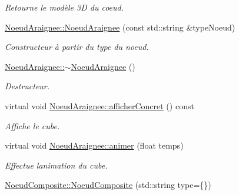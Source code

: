 \begin{DoxyCompactItemize}
\begin{DoxyCompactList}\small\item\em Retourne le modèle 3\+D du coeud. \end{DoxyCompactList}\item 
\hyperlink{group__inf2990_ga0ca3d14d5baf9c6879ac53918cc54ba5}{Noeud\+Araignee\+::\+Noeud\+Araignee} (const std\+::string \&type\+Noeud)
\begin{DoxyCompactList}\small\item\em Constructeur à partir du type du noeud. \end{DoxyCompactList}\item 
\hyperlink{group__inf2990_ga78bf0250c601da26edb8cd8f2cddec10}{Noeud\+Araignee\+::$\sim$\+Noeud\+Araignee} ()
\begin{DoxyCompactList}\small\item\em Destructeur. \end{DoxyCompactList}\item 
virtual void \hyperlink{group__inf2990_ga4f9e7fbb424a0cb18e01ab12a092fc02}{Noeud\+Araignee\+::afficher\+Concret} () const 
\begin{DoxyCompactList}\small\item\em Affiche le cube. \end{DoxyCompactList}\item 
\hypertarget{group__inf2990_gae3f4c490330d597a18975014c06a05ca}{}virtual void \hyperlink{group__inf2990_gae3f4c490330d597a18975014c06a05ca}{Noeud\+Araignee\+::animer} (float temps)\label{group__inf2990_gae3f4c490330d597a18975014c06a05ca}

\begin{DoxyCompactList}\small\item\em Effectue l\textquotesingle{}animation du cube. \end{DoxyCompactList}\item 
\hypertarget{group__inf2990_ga9493824e1865121cb75097a28132573b}{}\hyperlink{group__inf2990_ga9493824e1865121cb75097a28132573b}{Noeud\+Composite\+::\+Noeud\+Composite} (std\+::string type=\{\})\label{group__inf2990_ga9493824e1865121cb75097a28132573b}


\end{DoxyCompactItemize}
